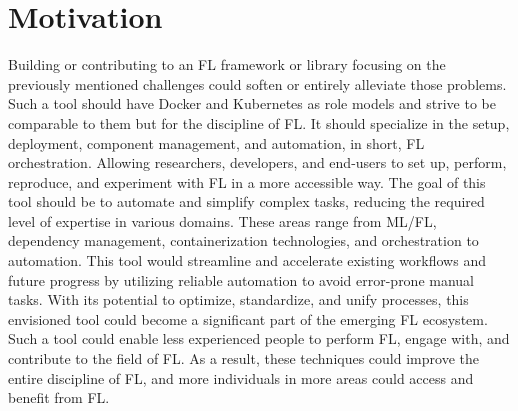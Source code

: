 \section{Motivation}

Building or contributing to an FL framework or library focusing on the previously mentioned challenges could soften or entirely alleviate those problems. 
Such a tool should have Docker and Kubernetes as role models and strive to be comparable to them but for the discipline of FL.
It should specialize in the setup, deployment, component management, and automation, in short, FL orchestration.
Allowing researchers, developers, and end-users to set up, perform, reproduce, and experiment with FL in a more accessible way.
The goal of this tool should be to automate and simplify complex tasks, reducing the required level of expertise in various domains.
These areas range from ML/FL, dependency management, containerization technologies, and orchestration to automation.
This tool would streamline and accelerate existing workflows and future progress by utilizing reliable automation to avoid error-prone manual tasks.
With its potential to optimize, standardize, and unify processes, this envisioned tool could become a significant part of the emerging FL ecosystem.
Such a tool could enable less experienced people to perform FL, engage with, and contribute to the field of FL.
As a result, these techniques could improve the entire discipline of FL, and more individuals in more areas could access and benefit from FL.
